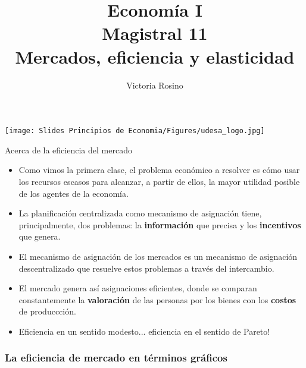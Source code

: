 \documentclass{beamer}
\title[Economía I]{Economía I \vspace{3mm}
\\ Magistral 11 \vspace{3mm} \\ Mercados, eficiencia y elasticidad}
\date{}
\author[Victoria Rosino]{Victoria Rosino}
\institute[]{Universidad de San Andrés}
\begin{document}
\begin{frame}
\vspace{0.3cm}
\titlepage
\centering
\vspace{-0.9cm}
\texttt{[image: Slides Principios de Economia/Figures/udesa\_logo.jpg]} 
\end{frame}


\begin{frame}{Acerca de la eficiencia del mercado}
    \begin{itemize}
        \item Como vimos la primera clase, el problema económico a resolver es cómo usar los recursos escasos para alcanzar, a partir de ellos, la mayor utilidad posible de los agentes de la economía.
      \item La planificación centralizada como mecanismo de asignación tiene, principalmente, dos problemas: la \textbf{información} que precisa y los \textbf{incentivos} que genera.
      \item El mecanismo de asignación de los mercados es un mecanismo de asignación descentralizado que resuelve estos problemas a través del intercambio.
      \item El mercado genera así asignaciones eficientes, donde se comparan constantemente la \textbf{valoración} de las personas por los bienes con los \textbf{costos} de produccción.
      \item Eficiencia en un sentido modesto... eficiencia en el sentido de Pareto!
    \end{itemize}
\end{frame}

\begin{frame}
\frametitle{La eficiencia de mercado en términos gráficos}
    \begin{figure}[H]
    \begin{center}
    \end{center}
    \end{figure}
\end{frame}
\end{document}
